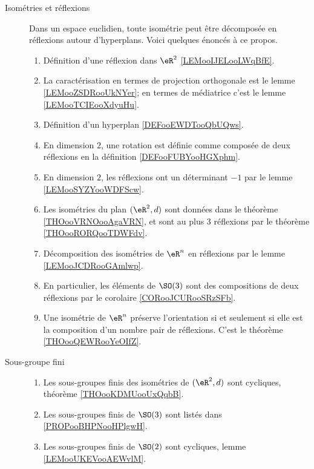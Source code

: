 \begin{description}
	\item[Isométries et réflexions]
	      Dans un espace euclidien, toute isométrie peut être décomposée en réflexions autour d'hyperplans. Voici quelques énoncés à ce propos.
	      \begin{enumerate}
		      \item
		            Définition d'une réflexion dans \( \eR^2\) \ref{LEMooIJELooLWqBfE}.
		      \item
		            La caractérisation en termes de projection orthogonale est le lemme \ref{LEMooZSDRooUkNYer}; en termes de médiatrice c'est le lemme \ref{LEMooTCIEooXdyuHu}.
		      \item
		            Définition d'un hyperplan \ref{DEFooEWDTooQbUQws}.
		      \item
		            En dimension \( 2\), une rotation est définie comme composée de deux réflexions en la définition \ref{DEFooFUBYooHGXphm}.
		      \item
		            En dimension \( 2\), les réflexions ont un déterminant \( -1\) par le lemme \ref{LEMooSYZYooWDFScw}.
		      \item
		            Les isométries du plan \( (\eR^2,d)\) sont données dans le théorème \ref{THOooVRNOooAgaVRN}, et sont au plus 3 réflexions par le théorème \ref{THOooRORQooTDWFdv}.
		      \item
		            Décomposition des isométries de \( \eR^n\) en réflexions par le lemme \ref{LEMooJCDRooGAmlwp}.
		      \item
		            En particulier, les éléments de \( \SO(3)\) sont des compositions de deux réflexions par le corolaire \ref{CORooJCURooSRzSFb}.
		      \item
		            Une isométrie de \( \eR^n\) préserve l'orientation si et seulement si elle est la composition d'un nombre pair de réflexions. C'est le théorème \ref{THOooQEWRooYeOIfZ}.
	      \end{enumerate}
	\item[Sous-groupe fini]
	      \begin{enumerate}
		      \item
		            Les sous-groupes finis des isométries de \( (\eR^2,d)\) sont cycliques, théorème \ref{THOooKDMUooUxQqbB}.
		      \item
		            Les sous-groupes finis de \( \SO(3)\) sont listés dans \ref{PROPooBHPNooHPlgwH}.
		      \item
		            Les sous-groupes finis de \( \SO(2)\) sont cycliques, lemme \ref{LEMooUKEVooAEWvlM}.
	      \end{enumerate}
\end{description}
